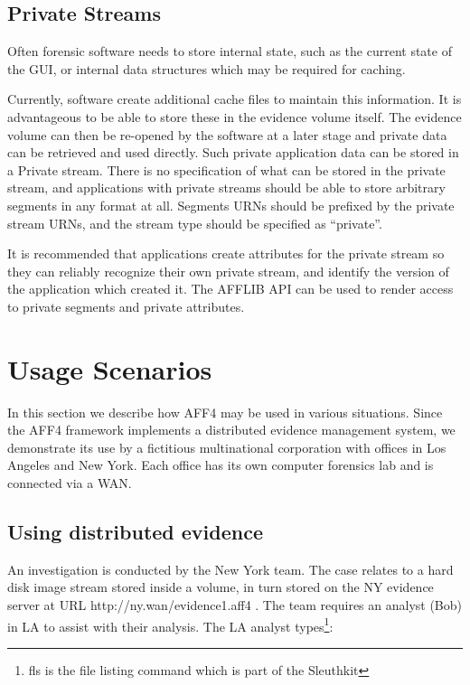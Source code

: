 \documentclass[10pt, conference]{IEEEtran}
\begin{document}
{{\subsection{Private Streams}
Often forensic software needs to store internal state, such as the
current state of the GUI, or internal data structures which may be
required for caching. 

Currently, software create additional cache files to maintain this
information. It is advantageous to be able to store these in the
evidence volume itself. The evidence volume can then be re-opened by
the software at a later stage and private data can be retrieved and
used directly. Such private application data can be stored in a
Private stream. There is no specification of what can be stored in the
private stream, and applications with private streams should be able
to store arbitrary segments in any format at all. Segments URNs should
be prefixed by the private stream URNs, and the stream type should be
specified as ``private''.

It is recommended that applications create attributes for the private
stream so they can reliably recognize their own private stream, and
identify the version of the application which created it. The AFFLIB
API can be used to render access to private segments and private
attributes.

\section{Usage Scenarios}
In this section we describe how AFF4 may be used in various
situations. Since the AFF4 framework implements a distributed evidence
management system, we demonstrate its use by a fictitious
multinational corporation with offices in Los Angeles and New
York. Each office has its own computer forensics lab and is connected
via a WAN.

\subsection{Using distributed evidence}
An investigation is conducted by the New York team. The case relates
to a hard disk image stream stored inside a volume, in turn stored on
the NY evidence server at URL http://ny.wan/evidence1.aff4 . The team
requires an analyst (Bob) in LA to assist with their analysis. The LA
analyst types\footnote{fls is the file listing command which is part
of the Sleuthkit}:

}}
\end{document}

